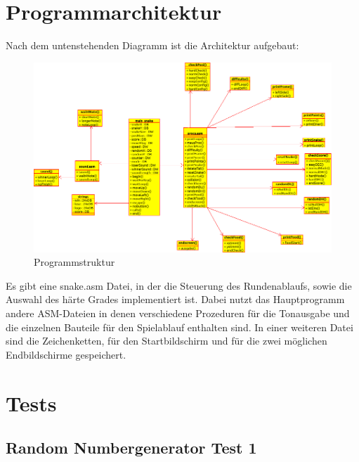 \documentclass[a4paper,10pt]{article}
\begin{document}
	\section{Programmarchitektur}
		Nach dem untenstehenden Diagramm ist die Architektur aufgebaut: \\
		\begin{figure}[h]
			\centering
			\includegraphics[width=1\textwidth]{Klassendiagramm_aktuell}
			\caption{Programmstruktur}
			\label{UML}
		\end{figure}
		
		Es gibt eine snake.asm Datei, in der die Steuerung des Rundenablaufs, 
		sowie die Auswahl des härte Grades implementiert ist. Dabei nutzt das 
		Hauptprogramm andere ASM-Dateien in denen verschiedene Prozeduren für 
		die Tonausgabe und die einzelnen Bauteile für den Spielablauf enthalten 
		sind. In einer weiteren Datei sind die Zeichenketten, für den 
		Startbildschirm und für die zwei möglichen Endbildschirme gespeichert.\\
		\newpage
	\section{Tests}
		\subsection{Random Numbergenerator Test 1}
			
\end{document}
